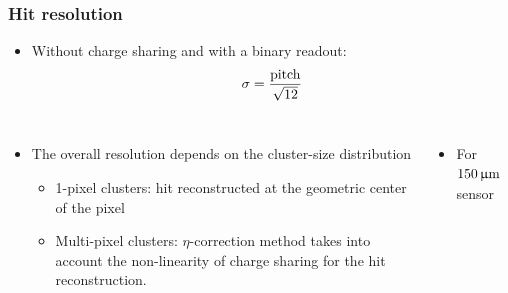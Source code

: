 \begin{frame}
  \frametitle{Hit resolution}

  \begin{itemize}
  \item Without charge sharing and with a binary readout: \\
    \begin{equation*}
      \sigma={\text{pitch} \over \sqrt{12}}
    \end{equation*}
  \end{itemize}

    \begin{columns}[t]
      \begin{itemize}
      \item The overall resolution depends on the cluster-size
        distribution
        \begin{itemize}
        \item 1-pixel clusters: hit reconstructed at the geometric center
          of the pixel
        \item Multi-pixel clusters: $\eta$-correction method takes into
          account the non-linearity of charge sharing for the hit
          reconstruction.
        \end{itemize}
      \end{itemize}

    \begin{itemize}
    \item For $150\,\upmu\mathrm{m}$ sensor
    \end{itemize}

    \centering
\end{columns}
\end{frame}
